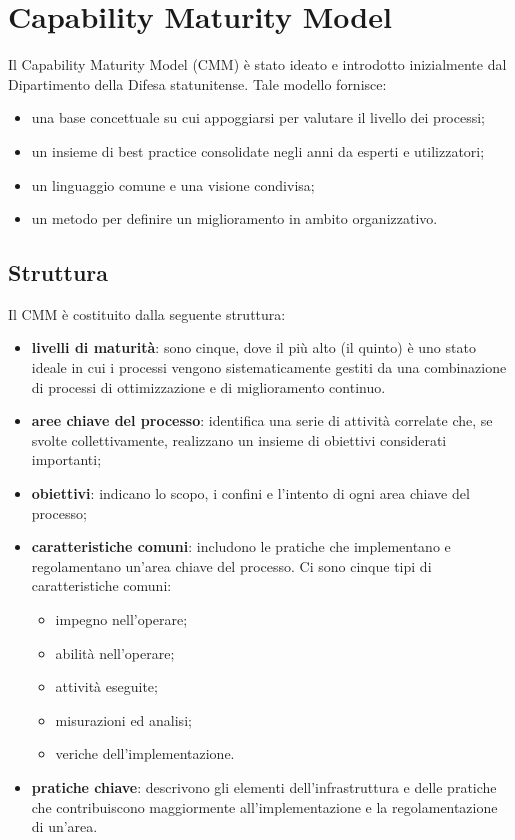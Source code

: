 \documentclass[PianoDiQualifica.tex]{subfiles}
\begin{document}
\hypertarget{CMM_label}{\section{Capability Maturity Model}}
	Il Capability Maturity Model (CMM) è stato ideato e introdotto inizialmente dal Dipartimento della Difesa statunitense. Tale modello
	fornisce:
	\begin{itemize}
		\item una base concettuale su cui appoggiarsi per valutare il livello dei processi;
		\item un insieme di best practice consolidate negli anni da esperti e utilizzatori;
		\item un linguaggio comune e una visione condivisa;
		\item un metodo per definire un miglioramento in ambito organizzativo.
	\end{itemize}
	\subsection{Struttura}
	Il CMM è costituito dalla seguente struttura:
	\begin{itemize}
		\item \textbf{livelli di maturità}: sono cinque, dove il più alto (il quinto) è uno stato ideale in cui i processi vengono sistematicamente
		gestiti da una combinazione di processi di ottimizzazione e di miglioramento continuo. 
		\item \textbf{aree chiave del processo}: identifica una serie di attività correlate che, se svolte collettivamente,
		realizzano un insieme di obiettivi considerati importanti;
		\item \textbf{obiettivi}: indicano lo scopo, i confini e l'intento di ogni area chiave del processo;
		\item \textbf{caratteristiche comuni}: includono le pratiche che implementano e regolamentano un'area chiave del processo. Ci sono cinque
		tipi di caratteristiche comuni:
		\begin{itemize}
			\item impegno nell'operare;
			\item abilità nell'operare;
			\item attività eseguite;
			\item misurazioni ed analisi;
			\item veriche dell'implementazione.
		\end{itemize}
		\item \textbf{pratiche chiave}: descrivono gli elementi dell'infrastruttura e delle pratiche che contribuiscono maggiormente all'implementazione
		e la regolamentazione di un'area.
	\end{itemize}
	
\end{document}
